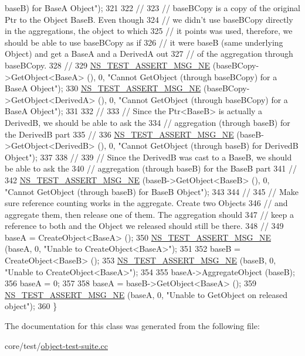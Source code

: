 \begin{DoxyCode}
{       baseB) for BaseA Object"});
321 
322   \textcolor{comment}{//}
323   \textcolor{comment}{// baseBCopy is a copy of the original Ptr to the Object BaseB.  Even though}
324   \textcolor{comment}{// we didn't use baseBCopy directly in the aggregations, the object to which}
325   \textcolor{comment}{// it points was used, therefore, we should be able to use baseBCopy as if}
326   \textcolor{comment}{// it were baseB (same underlying Object) and get a BaseA and a DerivedA out }
327   \textcolor{comment}{// of the aggregation through baseBCopy.}
328   \textcolor{comment}{//}
329   \hyperlink{group__testing_ga73d66fb0050a5111453fd144e767b91a}{NS\_TEST\_ASSERT\_MSG\_NE} (baseBCopy->GetObject<BaseA> (), 0, \textcolor{stringliteral}{"Cannot GetObject (through
       baseBCopy) for a BaseA Object"});
330   \hyperlink{group__testing_ga73d66fb0050a5111453fd144e767b91a}{NS\_TEST\_ASSERT\_MSG\_NE} (baseBCopy->GetObject<DerivedA> (), 0, \textcolor{stringliteral}{"Cannot GetObject
       (through baseBCopy) for a BaseA Object"});
331 
332   \textcolor{comment}{//}
333   \textcolor{comment}{// Since the Ptr<BaseB> is actually a DerivedB, we should be able to ask the }
334   \textcolor{comment}{// aggregation (through baseB) for the DerivedB part}
335   \textcolor{comment}{//}
336   \hyperlink{group__testing_ga73d66fb0050a5111453fd144e767b91a}{NS\_TEST\_ASSERT\_MSG\_NE} (baseB->GetObject<DerivedB> (), 0, \textcolor{stringliteral}{"Cannot GetObject (through
       baseB) for DerivedB Object"});
337 
338   \textcolor{comment}{//}
339   \textcolor{comment}{// Since the DerivedB was cast to a BaseB, we should be able to ask the }
340   \textcolor{comment}{// aggregation (through baseB) for the BaseB part}
341   \textcolor{comment}{//}
342   \hyperlink{group__testing_ga73d66fb0050a5111453fd144e767b91a}{NS\_TEST\_ASSERT\_MSG\_NE} (baseB->GetObject<BaseB> (), 0, \textcolor{stringliteral}{"Cannot GetObject (through
       baseB) for BaseB Object"});
343 
344   \textcolor{comment}{//}
345   \textcolor{comment}{// Make sure reference counting works in the aggregate.  Create two Objects}
346   \textcolor{comment}{// and aggregate them, then release one of them.  The aggregation should}
347   \textcolor{comment}{// keep a reference to both and the Object we released should still be there.}
348   \textcolor{comment}{//}
349   baseA = CreateObject<BaseA> ();
350   \hyperlink{group__testing_ga73d66fb0050a5111453fd144e767b91a}{NS\_TEST\_ASSERT\_MSG\_NE} (baseA, 0, \textcolor{stringliteral}{"Unable to CreateObject<BaseA>"});
351 
352   baseB = CreateObject<BaseB> ();
353   \hyperlink{group__testing_ga73d66fb0050a5111453fd144e767b91a}{NS\_TEST\_ASSERT\_MSG\_NE} (baseB, 0, \textcolor{stringliteral}{"Unable to CreateObject<BaseA>"});
354 
355   baseA->AggregateObject (baseB);
356   baseA = 0;
357 
358   baseA = baseB->GetObject<BaseA> ();
359   \hyperlink{group__testing_ga73d66fb0050a5111453fd144e767b91a}{NS\_TEST\_ASSERT\_MSG\_NE} (baseA, 0, \textcolor{stringliteral}{"Unable to GetObject on released object"});
360 \}
\end{DoxyCode}


The documentation for this class was generated from the following file\+:\begin{DoxyCompactItemize}
\item 
core/test/\hyperlink{object-test-suite_8cc}{object-\/test-\/suite.\+cc}\end{DoxyCompactItemize}
